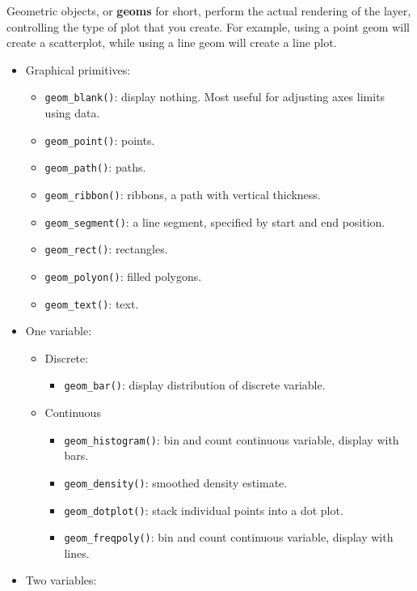 Geometric objects, or \textbf{geoms} for short, perform the actual
rendering of the layer, controlling the type of plot that you create.
For example, using a point geom will create a scatterplot, while using a
line geom will create a line plot.

\begin{itemize}
\tightlist
\item
  Graphical primitives:

  \begin{itemize}
  \tightlist
  \item
    \texttt{geom\_blank()}: display nothing. Most useful for adjusting
    axes limits using data.
  \item
    \texttt{geom\_point()}: points.
  \item
    \texttt{geom\_path()}: paths.
  \item
    \texttt{geom\_ribbon()}: ribbons, a path with vertical thickness.
  \item
    \texttt{geom\_segment()}: a line segment, specified by start and end
    position.
  \item
    \texttt{geom\_rect()}: rectangles.
  \item
    \texttt{geom\_polyon()}: filled polygons.
  \item
    \texttt{geom\_text()}: text.
  \end{itemize}
\item
  One variable:

  \begin{itemize}
  \tightlist
  \item
    Discrete:

    \begin{itemize}
    \tightlist
    \item
      \texttt{geom\_bar()}: display distribution of discrete variable.
    \end{itemize}
  \item
    Continuous

    \begin{itemize}
    \tightlist
    \item
      \texttt{geom\_histogram()}: bin and count continuous variable,
      display with bars.
    \item
      \texttt{geom\_density()}: smoothed density estimate.
    \item
      \texttt{geom\_dotplot()}: stack individual points into a dot plot.
    \item
      \texttt{geom\_freqpoly()}: bin and count continuous variable,
      display with lines.
    \end{itemize}
  \end{itemize}
\item
  Two variables:


\end{itemize}
